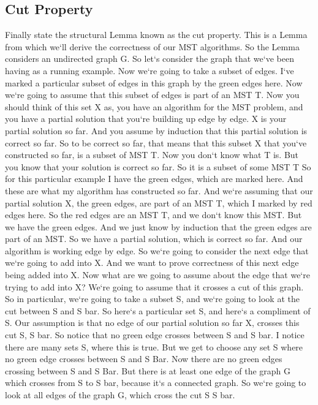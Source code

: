 \subsection{Cut Property}
Finally state the structural Lemma known as the cut property.
This is a Lemma from which we`ll derive the correctness of our MST algorithms.
So the Lemma considers an undirected graph G\@.
So let`s consider the graph that we`ve been having as a running example.
Now we`re going to take a subset of edges.
I`ve marked a particular subset of edges in this graph by the green edges here.
Now we`re going to assume that this subset of edges is part of an MST T\@.
Now you should think of this set X as, you have an algorithm for the MST problem, and you have a partial solution that you`re building up edge by edge.
X is your partial solution so far.
And you assume by induction that this partial solution is correct so far.
So to be correct so far, that means that this subset X that you`ve constructed so far, is a subset of MST T\@.
Now you don`t know what T is.
But you know that your solution is correct so far.
So it is a subset of some MST T So for this particular example I have the green edges, which are marked here.
And these are what my algorithm has constructed so far.
And we`re assuming that our partial solution X, the green edges, are part of an MST T, which I marked by red edges here.
So the red edges are an MST T, and we don`t know this MST\@.
But we have the green edges.
And we just know by induction that the green edges are part of an MST\@.
So we have a partial solution, which is correct so far.
And our algorithm is working edge by edge.
So we`re going to consider the next edge that we`re going to add into X\@.
And we want to prove correctness of this next edge being added into X\@.
Now what are we going to assume about the edge that we`re trying to add into X? We`re going to assume that it crosses a cut of this graph.
So in particular, we`re going to take a subset S, and we`re going to look at the cut between S and S bar.
So here`s a particular set S, and here`s a compliment of S\@.
Our assumption is that no edge of our partial solution so far X, crosses this cut S, S bar.
So notice that no green edge crosses between S and S bar.
I notice there are many sets S, where this is true.
But we get to choose any set S where no green edge crosses between S and S Bar.
Now there are no green edges crossing between S and S Bar.
But there is at least one edge of the graph G which crosses from S to S bar, because it`s a connected graph.
So we`re going to look at all edges of the graph G, which cross the cut S S bar.
